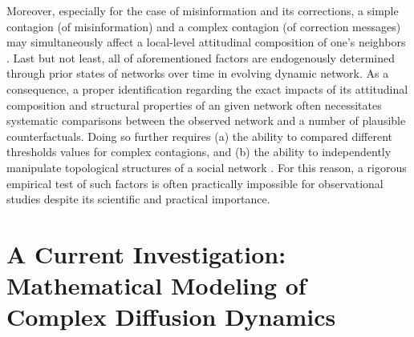 \documentclass[man, 12pt, a4paper, noextraspace]{apa6}
\begin{document}
    Moreover, especially for the case of misinformation and its corrections, a simple contagion (of misinformation) and a complex contagion (of correction messages) may simultaneously affect a local-level attitudinal composition of one's neighbors \parencite[i.e., those who endorse and believe misinformation vs. those who do not: e.g.,][]{campbell2013complex}. Last but not least, all of aforementioned factors are endogenously determined through prior states of networks over time in evolving dynamic network. As a consequence, a proper identification regarding the exact impacts of its attitudinal composition and structural properties of an given network often necessitates systematic comparisons between the observed network and a number of plausible counterfactuals. Doing so further requires (a) the ability to compared different thresholds values for complex contagions, and (b) the ability to independently manipulate topological structures of a social network \parencite[e.g.,][]{Centola2010Sience, Centola2007449, gonzalez2017decoding}. For this reason, a rigorous empirical test of such factors is often practically impossible for observational studies despite its scientific and practical importance. 
    
\section{A Current Investigation: Mathematical Modeling of Complex Diffusion Dynamics}
\end{document}
